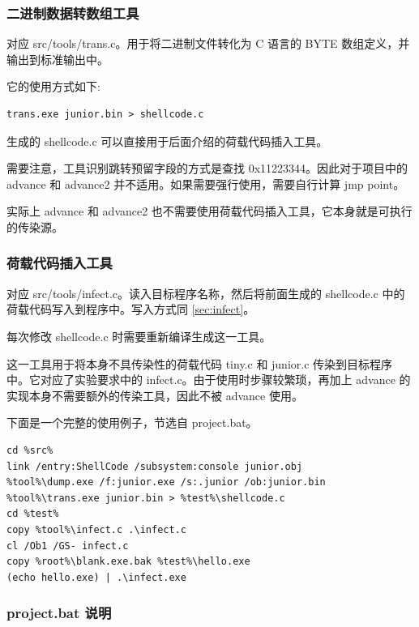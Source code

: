 \documentclass[UTF8]{ctexart}
\begin{document}
    \subsubsection{二进制数据转数组工具}

    对应 src/tools/trans.c。用于将二进制文件转化为 C 语言的 BYTE 数组定义，并输出到标准输出中。

    它的使用方式如下:

    \begin{lstlisting}
trans.exe junior.bin > shellcode.c
    \end{lstlisting}

    生成的 shellcode.c 可以直接用于后面介绍的荷载代码插入工具。

    需要注意，工具识别跳转预留字段的方式是查找 0x11223344。因此对于项目中的 advance 和 advance2 并不适用。如果需要强行使用，需要自行计算 jmp point。
    
    实际上 advance 和 advance2 也不需要使用荷载代码插入工具，它本身就是可执行的传染源。

    \subsubsection{荷载代码插入工具}

    对应 src/tools/infect.c。读入目标程序名称，然后将前面生成的 shellcode.c 中的荷载代码写入到程序中。写入方式同 \ref{sec:infect}。

    每次修改 shellcode.c 时需要重新编译生成这一工具。
    
    这一工具用于将本身不具传染性的荷载代码 tiny.c 和 junior.c 传染到目标程序中。它对应了实验要求中的 infect.c。由于使用时步骤较繁琐，再加上 advance 的实现本身不需要额外的传染工具，因此不被 advance 使用。

    下面是一个完整的使用例子，节选自 project.bat。
    
    \begin{lstlisting}
cd %src%
link /entry:ShellCode /subsystem:console junior.obj
%tool%\dump.exe /f:junior.exe /s:.junior /ob:junior.bin
%tool%\trans.exe junior.bin > %test%\shellcode.c
cd %test%
copy %tool%\infect.c .\infect.c
cl /Ob1 /GS- infect.c
copy %root%\blank.exe.bak %test%\hello.exe
(echo hello.exe) | .\infect.exe
    \end{lstlisting}

    \subsubsection{project.bat 说明}
\end{document}
